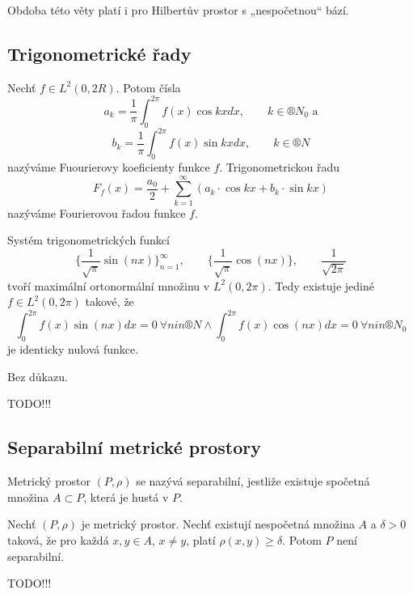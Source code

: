 \documentclass[12pt]{article}					%
\begin{document}
	\begin{poznamka}
		Obdoba této věty platí i pro Hilbertův prostor s „nespočetnou“ bází.
	\end{poznamka}

	\subsection{Trigonometrické řady}
	\begin{definice}
		Nechť $f \in L^2(0, 2R)$. Potom čísla
		$$ a_k = \frac{1}{\pi} \int_0^{2\pi} f(x) \cos k x dx,\qquad k \in ®N_0 \text{ a} $$
		$$ b_k = \frac{1}{\pi} \int_0^{2\pi} f(x) \sin k x dx,\qquad k \in ®N $$
		nazýváme Fuourierovy koeficienty funkce $f$. Trigonometrickou řadu
		$$ F_f(x) = \frac{a_0}{2} + \sum_{k=1}^∞ (a_k · \cos k x + b_k · \sin k x) $$
		nazýváme Fourierovou řadou funkce $f$.
	\end{definice}

	\begin{veta}
		Systém trigonometrických funkcí
		$$ \{\frac{1}{\sqrt{\pi}} \sin(nx)\}_{n=1}^∞, \qquad \{\frac{1}{\sqrt{\pi}} \cos(nx)\}, \qquad \frac{1}{\sqrt{2\pi}} $$
		tvoří maximální ortonormální množinu v $L^2(0, 2\pi)$. Tedy existuje jediné $f \in L^2(0, 2\pi)$ takové, že
		$$ \int_0^{2\pi} f(x) \sin(n x) dx = 0\ \forall n in ®N \land \int_0^{2\pi} f(x) \cos(n x) dx = 0\ \forall n in ®N_0 $$
		je identicky nulová funkce.

		\begin{dukazin}
			Bez důkazu.
		\end{dukazin}
	\end{veta}

	\begin{dusledek}
		TODO!!!
	\end{dusledek}


	\subsection{Separabilní metrické prostory}
	\begin{definice}
		Metrický prostor $(P, \rho)$ se nazývá separabilní, jestliže existuje spočetná množina $A \subset P$, která je hustá v $P$.
	\end{definice}

	\begin{veta}
		Nechť $(P, \rho)$ je metrický prostor. Nechť existují nespočetná množina $A$ a $\delta > 0$ taková, že pro každá $x, y \in A$, $x ≠ y$, platí $\rho(x, y) ≥ \delta$. Potom $P$ není separabilní.

		\begin{dukazin}
			TODO!!!
		\end{dukazin}
	\end{veta}
\end{document}

